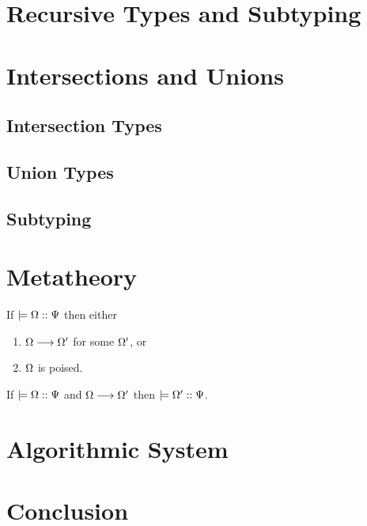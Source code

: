 \documentclass[a4paper,USenglish]{lipics-v2016}
\begin{document}
\section{Recursive Types and Subtyping}
\label{recursive}


\section{Intersections and Unions}
\label{refinements}

  \subsection{Intersection Types}

  \subsection{Union Types}

  \subsection{Subtyping}


\section{Metatheory}
\label{metatheory}

\begin{theorem}[Progress]
If $\models {\Omega} :: {\Psi}$ then either
\begin{enumerate}
  \item $\Omega \longrightarrow \Omega'$ for some $\Omega'$, or
  \item $\Omega$ is poised.
\end{enumerate}
\end{theorem}


\begin{theorem}[Preservation]
If $\models {\Omega} :: {\Psi}$ and $\Omega \longrightarrow \Omega'$ then $\models {\Omega'} :: {\Psi}$.
\end{theorem}


\section{Algorithmic System}
\label{algorithmic}


\section{Conclusion}
\label{conclusion}


\appendix





\end{document}
